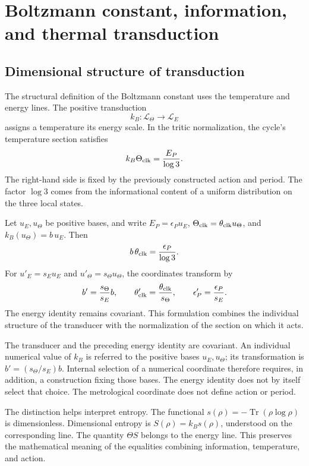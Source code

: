 \section{Boltzmann constant, information, and thermal transduction}
\label{sec:ii-boltzmann}

\subsection{Dimensional structure of transduction}

The structural definition of the Boltzmann constant uses the
temperature and energy lines. The positive transduction
\[
 k_B:\mathcal L_\Theta\longrightarrow\mathcal L_E
\]
assigns a temperature its energy scale. In the tritic
normalization, the cycle's temperature section satisfies
\[
 k_B\Theta_{\rm clk}=\frac{E_P}{\log3}.
\]
The right-hand side is fixed by the previously constructed action and
period. The factor \(\log3\) comes from the informational content
of a uniform distribution on the three local states.

Let \(u_E,u_\Theta\) be positive bases, and write
\(E_P=\epsilon_Pu_E\), \(\Theta_{\rm clk}=\theta_{\rm clk}u_\Theta\),
and \(k_B(u_\Theta)=b\,u_E\). Then
\[
 b\,\theta_{\rm clk}=\frac{\epsilon_P}{\log3}.
\]
For \(u'_E=s_Eu_E\) and \(u'_\Theta=s_\Theta u_\Theta\),
the coordinates transform by
\[
 b'=\frac{s_\Theta}{s_E}b,\qquad
 \theta'_{\rm clk}=\frac{\theta_{\rm clk}}{s_\Theta},\qquad
 \epsilon'_P=\frac{\epsilon_P}{s_E}.
\]
The energy identity remains covariant. This formulation combines
the individual structure of the transducer with the normalization of the
section on which it acts.

\begin{remark}
The transducer and the preceding energy identity are covariant.
An individual numerical value of \(k_B\) is referred to the positive bases
\(u_E,u_\Theta\); its transformation is \(b'=(s_\Theta/s_E)b\).
Internal selection of a numerical coordinate therefore requires,
in addition, a construction fixing those bases. The energy identity
does not by itself select that choice. The metrological coordinate
does not define action or period.
\end{remark}

The distinction helps interpret entropy. The functional
\(s(\rho)=-\operatorname{Tr}(\rho\log\rho)\) is dimensionless.
Dimensional entropy is \(S(\rho)=k_Bs(\rho)\), understood on
the corresponding line. The quantity \(\Theta S\) belongs to
the energy line. This preserves the mathematical meaning of the
equalities combining information, temperature, and action.

